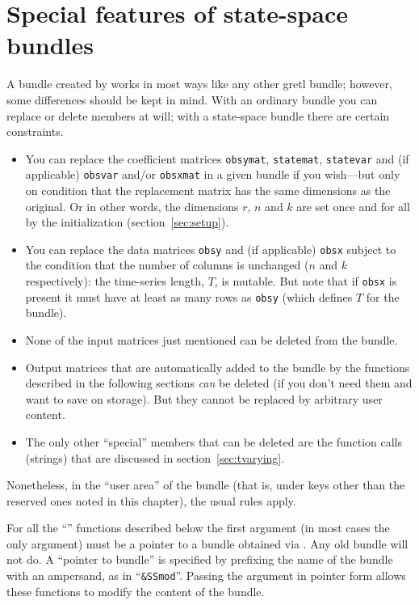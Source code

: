 \documentclass[a4paper]{article}
\begin{document}
\section{Special features of state-space bundles}
\label{sec:ss-special}

A bundle created by  works in most ways like any other
gretl bundle; however, some differences should be kept in mind.  With
an ordinary bundle you can replace or delete members at will; with a
state-space bundle there are certain constraints.

\begin{itemize}
\item You can replace the coefficient matrices \texttt{obsymat},
  \texttt{statemat}, \texttt{statevar} and (if applicable)
  \texttt{obsvar} and/or \texttt{obsxmat} in a given bundle if you
  wish---but only on condition that the replacement matrix has the
  same dimensions as the original. Or in other words, the dimensions
  $r$, $n$ and $k$ are set once and for all by the initialization
  (section~\ref{sec:setup}).
\item You can replace the data matrices \texttt{obsy} and (if
  applicable) \texttt{obsx} subject to the condition that the number
  of columns is unchanged ($n$ and $k$ respectively): the time-series
  length, $T$, is mutable. But note that if \texttt{obsx} is present
  it must have at least as many rows as \texttt{obsy} (which defines
  $T$ for the bundle).
\item None of the input matrices just mentioned can be deleted from
  the bundle.
\item Output matrices that are automatically added to the bundle by
  the functions described in the following sections \textit{can} be
  deleted (if you don't need them and want to save on storage). But
  they cannot be replaced by arbitrary user content.
\item The only other ``special'' members that can be deleted are the
  function calls (strings) that are discussed in
  section~\ref{sec:tvarying}.
\end{itemize}

Nonetheless, in the ``user area'' of the bundle (that is, under keys
other than the reserved ones noted in this chapter), the usual rules
apply.

For all the ``'' functions described below the first argument
(in most cases the only argument) must be a pointer to a bundle
obtained via . Any old bundle will not do. A ``pointer to
bundle'' is specified by prefixing the name of the bundle with an
ampersand, as in ``\verb|&SSmod|''. Passing the argument in pointer
form allows these functions to modify the content of the bundle.
\end{document}
